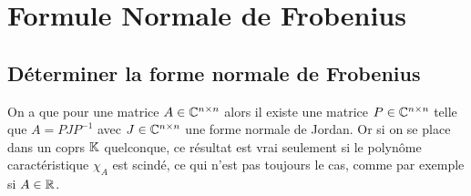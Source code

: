 \section{Formule Normale de Frobenius}
\subsection{Déterminer la forme normale de Frobenius}
On a que pour une matrice $A \in \mathbb C^{n \times n}$ alors il existe une matrice $P \in \mathbb C^{n \times n}$ telle que $A = P J P^{-1}$ avec $J \in \mathbb C^{n \times n}$ une forme normale de Jordan. Or si on se place dans un coprs $\mathbb K$ quelconque, ce résultat est vrai seulement si le polynôme caractéristique $\chi_A$ est scindé, ce qui n'est pas toujours le cas, comme par exemple si $A \in \mathbb R$. 



